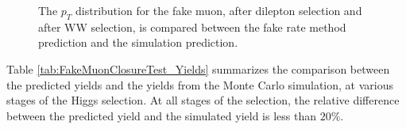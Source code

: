 \begin{figure}[!htbp]
\begin{center}
\caption{The $p_{T}$ distribution for the fake muon, after dilepton selection and after
WW selection, is compared between the fake rate method prediction and the simulation prediction. }
\label{fig:FakeMuonClosureTest_FakeMuPt}
\end{center}
\end{figure}

Table \ref{tab:FakeMuonClosureTest_Yields} summarizes the comparison between the
predicted yields and the yields from the Monte Carlo simulation, at various stages
of the Higgs selection. At all stages of the selection, the relative difference
between the predicted yield and the simulated yield is less than $20\%$.

